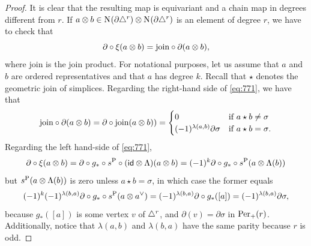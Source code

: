\begin{proof} It is clear that the resulting map is equivariant and a chain map in degrees different from $r$. If $a\otimes b \in \operatorname{N}_{}(\partial\triangle^{r})\otimes \operatorname{N}_{}(\partial\triangle^{r})$ is an element of degree $r$, we have to check that 
\begin{equation}\label{eq:771}
	\partial\circ \xi(a\otimes b) = \text{join}\circ \partial (a\otimes b),
\end{equation}
where $\text{join}$ is the join product. For notational purposes, let us assume that $a$ and $b$ are ordered representatives and that $a$ has degree $k$. Recall that $\star$ denotes the geometric join of simplices. Regarding the right-hand side of \eqref{eq:771}, we have that
\[
	\text{join}\circ \partial(a\otimes b) = \partial\circ \text{join}(a\otimes b)) = \begin{cases} 0 &\text{if $a\star b\neq  \sigma$} \\ (-1)^{\lambda(a,b)} \partial \sigma & \text{if $a\star b = \sigma$}.\end{cases}
\] 
Regarding the left hand-side of \eqref{eq:771},
\[
	\partial\circ \xi(a\ot b) 
	= \partial\circ g_*\circ s^{\Psd}\circ (\id \ot \alex)(a\otimes b) 
	= (-1)^{k}\partial\circ g_*\circ s^{\Psd}(a\otimes \alex(b))%
\]
but $s^{{\operatorname{P}}}(a\otimes \Lambda(b))$ is zero unless $a\star b = \sigma$, in which case the former equals
\[
	(-1)^{k}(-1)^{\lambda(b,a)} \partial\circ g_*\circ s^{{\operatorname{P}}}(a\otimes a^\vee)
	= (-1)^{\lambda(b,a)} \partial\circ g_* ([a])
	= (-1)^{\lambda(b,a)}\partial \sigma,
\]
because $g_*([a])$ is some vertex $v$ of $\triangle^{r}$, and $\partial(v) = \partial\sigma$ in $\mathrm{Per}_+(r)$. Additionally, notice that $\lambda(a,b)$ and $\lambda(b,a)$ have the same parity because $r$ is odd.



\end{proof}
